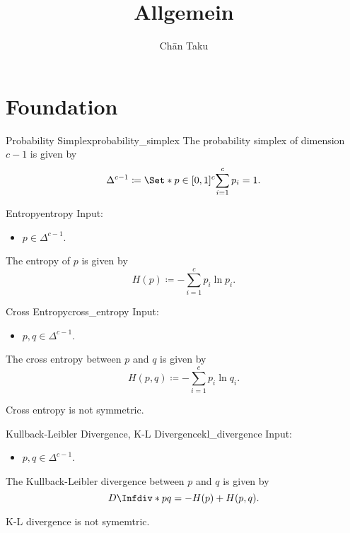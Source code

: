 \documentclass{article}
\title{Allgemein}
\author{Ch\=an Taku}
\begin{document}
\maketitle

\section{Foundation}

\begin{definition}{Probability Simplex}{probability_simplex}
    The probability simplex of dimension $c-1$ is given by
    \begin{align*}
        \Delta^{c-1} \coloneqq \Set*{p\in [0,1]^c}{\sum_{i=1}^c p_i = 1}.
    \end{align*}
\end{definition}

\begin{definition}{Entropy}{entropy}
    Input:
    \begin{itemize}
        \item $p\in \Delta^{c-1}$.
    \end{itemize}
    The entropy of $p$ is given by
    \[ H(p) \coloneqq -\sum_{i=1}^c p_i \ln p_i. \]
\end{definition}

\begin{definition}{Cross Entropy}{cross_entropy}
    Input:
    \begin{itemize}
        \item $p,q\in \Delta^{c-1}$.
    \end{itemize}
    The cross entropy between $p$ and $q$ is given by
    \[ H(p,q) \coloneqq -\sum_{i=1}^c p_i \ln q_i. \]
\end{definition}

\begin{warning}
    Cross entropy is not symmetric.
\end{warning}

\begin{definition}{Kullback-Leibler Divergence, K-L Divergence}{kl_divergence}
    Input:
    \begin{itemize}
        \item $p,q\in \Delta^{c-1}$.
    \end{itemize}
    The Kullback-Leibler divergence between $p$ and $q$ is given by
    \[ D\Infdiv*{p}{q} = -H(p) + H(p,q). \]
\end{definition}

\begin{warning}
    K-L divergence is not symemtric.
\end{warning}
\end{document}

